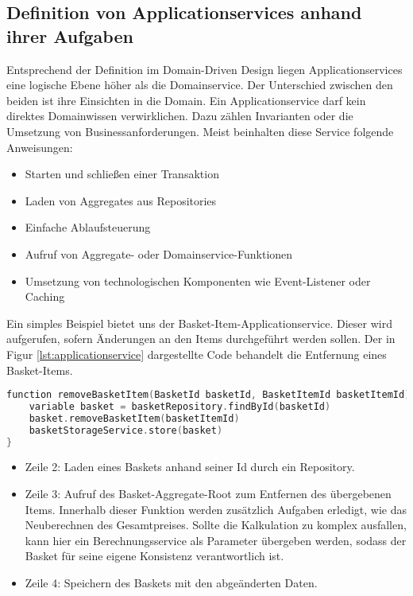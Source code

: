 \subsection{Definition von Applicationservices anhand ihrer Aufgaben}

Entsprechend der Definition im Domain-Driven Design liegen Applicationservices eine logische Ebene höher als die Domainservice. Der Unterschied zwischen den beiden ist ihre Einsichten in die Domain. Ein Applicationservice darf kein direktes Domainwissen verwirklichen. Dazu zählen Invarianten oder die Umsetzung von Businessanforderungen.
Meist beinhalten diese Service folgende Anweisungen:

\begin{itemize}[noitemsep,nolistsep]
	\item Starten und schließen einer Transaktion
	\item Laden von Aggregates aus Repositories
	\item Einfache Ablaufsteuerung
	\item Aufruf von Aggregate- oder Domainservice-Funktionen
	\item Umsetzung von technologischen Komponenten wie Event-Listener oder Caching
\end{itemize}

Ein simples Beispiel bietet uns der Basket-Item-Applicationservice. Dieser wird aufgerufen, sofern Änderungen an den Items durchgeführt werden sollen. Der in Figur \ref{lst:applicationservice} dargestellte Code behandelt die Entfernung eines Basket-Items.

\begin{minipage}{\linewidth} %
	\begin{lstlisting}[caption={Eine Beispielsfunktion des BasketItem-Applikationservice}, label={lst:applicationservice}, language=Kotlin]
function removeBasketItem(BasketId basketId, BasketItemId basketItemId) {
	variable basket = basketRepository.findById(basketId)
	basket.removeBasketItem(basketItemId)
	basketStorageService.store(basket)
}
	\end{lstlisting}
\end{minipage}

\begin{itemize}[noitemsep,nolistsep]
	\item Zeile 2: Laden eines Baskets anhand seiner Id durch ein Repository. 
	\item Zeile 3: Aufruf des Basket-Aggregate-Root zum Entfernen des übergebenen Items. Innerhalb dieser Funktion werden zusätzlich Aufgaben erledigt, wie das Neuberechnen des Gesamtpreises. Sollte die Kalkulation zu komplex ausfallen, kann hier ein Berechnungsservice als Parameter übergeben werden, sodass der Basket für seine eigene Konsistenz verantwortlich ist. 
	\item Zeile 4: Speichern des Baskets mit den abgeänderten Daten.
\end{itemize}

